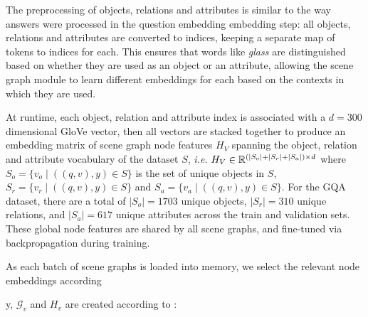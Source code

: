 The preprocessing of objects, relations and attributes is similar to the way answers were processed in the question embedding embedding step: all objects, relations and attributes are converted to indices, keeping a separate map of tokens to indices for each. This ensures that words like \textit{glass} are distinguished based on whether they are used as an object or an attribute, allowing the scene graph module to learn different embeddings for each based on the contexts in which they are used.

At runtime, each object, relation and attribute index is associated with a \(d = 300\) dimensional GloVe vector, then all vectors are stacked together to produce an embedding matrix of scene graph node features \(H_V\) spanning the object, relation and attribute vocabulary of the dataset \(S\), \textit{i.e.} \(H_V \in \mathbb{R}^{(|S_o| + |S_r| + |S_a|) \times d}\) where \(S_o = \{v_o \mid ((q, v), y) \in S\}\) is the set of unique objects in \(S\), \(S_r = \{v_r \mid ((q, v), y) \in S\}\) and \(S_a = \{v_a \mid ((q, v), y) \in S\}\). For the GQA dataset, there are a total of \(|S_o| = 1703\) unique objects, \(|S_r| = 310\) unique relations, and \(|S_a| = 617\) unique attributes across the train and validation sets. These global node features are shared by all scene graphs, and fine-tuned via backpropagation  during training.


 As each batch of scene graphs is loaded into memory, we select the relevant node embeddings according \(\)


y, \(\mathcal{G}_v\) and \(H_v\) are created according to \algorithmcfname{ \ref{algorithm:scene_graph_construction}}:


